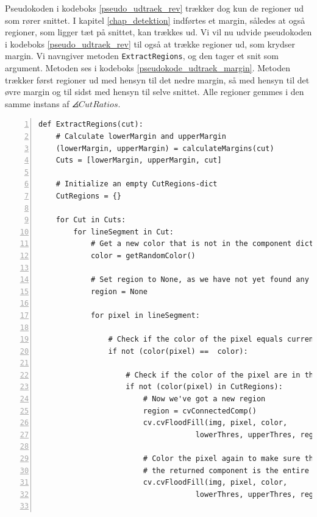 {
Pseudokoden i kodeboks \ref{pseudo_udtraek_rev} trækker dog kun de
regioner ud som rører snittet. I kapitel \ref{chap_detektion} indførtes
et margin, således at også regioner, som ligger tæt på snittet, kan
trækkes ud. Vi vil nu udvide pseudokoden i kodeboks
\ref{pseudo_udtraek_rev} til også at trække regioner ud, som krydser
margin. Vi navngiver metoden \texttt{ExtractRegions}, og den tager et
snit som argument. Metoden ses i kodeboks
\ref{pseudokode_udtraek_margin}. Metoden trækker først regioner ud med
hensyn til det nedre margin, så med hensyn til det øvre margin og til
sidst med hensyn til selve snittet. Alle regioner gemmes i den samme
instans af $\angles{CutRatios}$.

\begin{lstlisting}[caption={Pseudokode til udtrækning af regioner med
    margin.},captionpos=b,label={pseudo_udtraek_margin},numbers=left,
    frame=single, breaklines=false, float=h]
def ExtractRegions(cut):
    # Calculate lowerMargin and upperMargin
    (lowerMargin, upperMargin) = calculateMargins(cut)
    Cuts = [lowerMargin, upperMargin, cut]

    # Initialize an empty CutRegions-dict
    CutRegions = {}

    for Cut in Cuts:
        for lineSegment in Cut:
            # Get a new color that is not in the component dictionary
            color = getRandomColor()

            # Set region to None, as we have not yet found any
            region = None

            for pixel in lineSegment:

                # Check if the color of the pixel equals current color
                if not (color(pixel) ==  color):

                    # Check if the color of the pixel are in the saved regions
                    if not (color(pixel) in CutRegions):
                        # Now we've got a new region
                        region = cvConnectedComp()
                        cv.cvFloodFill(img, pixel, color,
                                    lowerThres, upperThres, region)

                        # Color the pixel again to make sure that
                        # the returned component is the entire region
                        cv.cvFloodFill(img, pixel, color,
                                    lowerThres, upperThres, region)


\end{lstlisting}}
